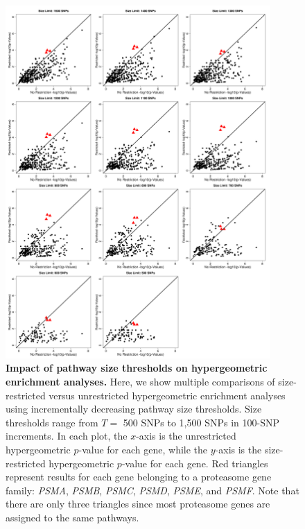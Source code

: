 \documentclass[10pt]{article}
\begin{document}
\begin{figure}[H]
\label{InterPath-Supp-Figure-Prot-Heatplots-Pakistani}
\end{figure}
\clearpage


\begin{figure}[htbp]
\centering
\vspace*{-1cm}
\includegraphics[width=0.9\textwidth]{Images/Supp/InterPath_Supp_Figure_Hypergemeotric_SizeThresholds_vs1.png}
\caption{\textbf{Impact of pathway size thresholds on hypergeometric enrichment analyses.} 
Here, we show multiple comparisons of size-restricted versus unrestricted hypergeometric 
enrichment analyses using incrementally decreasing pathway size thresholds. Size thresholds 
range from $T =$ 500 SNPs to 1,500 SNPs in 100-SNP increments. In each plot, the $x$-axis is the 
unrestricted hypergeometric $p$-value for each gene, while the $y$-axis is the size-restricted 
hypergeometric $p$-value for each gene. Red triangles represent results for each gene belonging 
to a proteasome gene family: {\emph{PSMA}}, {\emph{PSMB}}, {\emph{PSMC}}, {\emph{PSMD}}, 
{\emph{PSME}}, and {\emph{PSMF}}. Note that there are only three triangles since most proteasome 
genes are assigned to the same pathways.}
\label{InterPath-Supp-Figure-Hypergeoemtric-SizeThresholds}
\end{figure}
\clearpage
\end{document}
